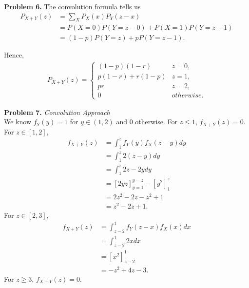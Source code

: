 \documentclass{article}
\begin{document}
\textbf{Problem 6.}
The convolution formula tells us
\begin{align}
    P_{X+Y}(z) & = \sum_{X}P_X(x)P_Y(z-x) \\
    & = P(X=0)P(Y=z-0)+P(X=1)P(Y=z-1) \\
    & = (1-p)P(Y=z)+pP(Y=z-1).
\end{align}

Hence,
\begin{align}
    P_{X+Y}(z) = 
    \begin{cases}
        (1-p)(1-r) & z = 0, \\
        p(1-r)+r(1-p) & z = 1, \\
        pr & z = 2, \\
        0 & otherwise.
    \end{cases}
\end{align}
\bigbreak

\textbf{Problem 7.}
\emph{Convolution Approach} \\
We know $f_Y(y)=1$ for $y \in (1,2)$ and 0 otherwise. For $z \le 1$, $f_{X+Y}(z)=0$.
For $z \in [1,2]$,
\begin{align}
    f_{X+Y}(z) & = \int_{1}^{z}f_Y(y)f_X(z-y)dy \\ 
    & = \int_{1}^{z}2(z-y)dy \\
    & = \int_{1}^{z}2z - 2y dy \\
    & = \left[2yz\right]_{y=1}^{y=z}-\left[y^2\right]_1^z \\
    & = 2z^2-2z-z^2+1 \\
    & = z^2-2z+1.
\end{align}
For $z \in [2,3]$,
\begin{align}
    f_{X+Y}(z) & = \int_{z-2}^{1}f_Y(z-x)f_X(x)dx \\
    & = \int_{z-2}^{1}2xdx \\
    & = \left[x^2\right]_{z-2}^1 \\
    & = -z^2+4z-3.
\end{align}
For $z\ge 3$, $f_{X+Y}(z)=0$.
\bigbreak
\end{document}
